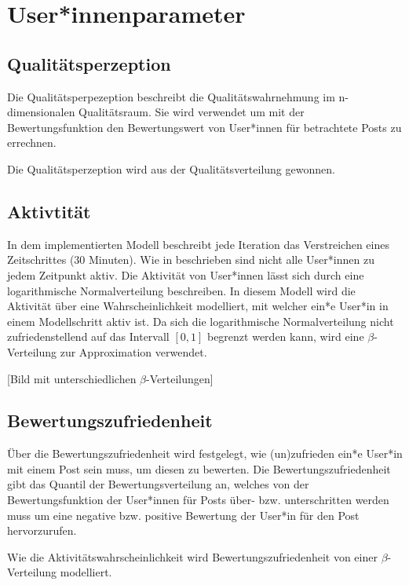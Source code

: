 \section{User*innenparameter}


\subsection{Qualitätsperzeption}

Die Qualitätsperpezeption beschreibt die Qualitätswahrnehmung im n-dimensionalen Qualitätsraum. Sie wird verwendet um mit der Bewertungsfunktion den Bewertungswert von User*innen für betrachtete Posts zu errechnen.

Die Qualitätsperzeption wird aus der Qualitätsverteilung gewonnen.

\subsection{Aktivtität}

In dem implementierten Modell beschreibt jede Iteration das Verstreichen eines Zeitschrittes (30 Minuten). Wie in \cite{Hogg20121} beschrieben sind nicht alle User*innen zu jedem Zeitpunkt aktiv. Die Aktivität von User*innen lässt sich durch eine logarithmische Normalverteilung
beschreiben. In diesem Modell wird die Aktivität über eine Wahrscheinlichkeit modelliert,  mit welcher ein*e User*in in einem Modellschritt aktiv ist. Da sich die logarithmische Normalverteilung nicht zufriedenstellend auf das Intervall $ [0,1]$ begrenzt werden kann, wird eine $\beta$-Verteilung zur Approximation verwendet.

[Bild mit unterschiedlichen $\beta$-Verteilungen]

\subsection{Bewertungszufriedenheit}


Über die Bewertungszufriedenheit wird festgelegt, wie (un)zufrieden ein*e User*in mit einem Post sein muss, um diesen zu bewerten. 
Die Bewertungszufriedenheit gibt das Quantil der Bewertungsverteilung an, welches von der Bewertungsfunktion der User*innen für Posts über- bzw. unterschritten werden muss um eine negative bzw. positive Bewertung der User*in für den Post hervorzurufen.

Wie die Aktivitätswahrscheinlichkeit wird Bewertungszufriedenheit von einer $\beta$-Verteilung modelliert.

